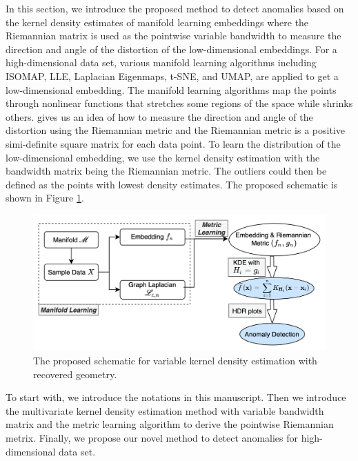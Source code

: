 \documentclass[11pt,a4paper,]{article}
\begin{document}
In this section, we introduce the proposed method to detect anomalies based on the kernel density estimates of manifold learning embeddings where the Riemannian matrix is used as the pointwise variable bandwidth to measure the direction and angle of the distortion of the low-dimensional embeddings. For a high-dimensional data set, various manifold learning algorithms including ISOMAP, LLE, Laplacian Eigenmaps, t-SNE, and UMAP, are applied to get a low-dimensional embedding. The manifold learning algorithms map the points through nonlinear functions that stretches some regions of the space while shrinks others. \textcite{Perrault-Joncas2013-pq} gives us an idea of how to measure the direction and angle of the distortion using the Riemannian metric and the Riemannian metric is a positive simi-definite square matrix for each data point. To learn the distribution of the low-dimensional embedding, we use the kernel density estimation with the bandwidth matrix being the Riemannian metric. The outliers could then be defined as the points with lowest density estimates. The proposed schematic is shown in Figure \ref{fig:vkde}.



\begin{figure}

{\centering \includegraphics[width=0.95\linewidth]{figures/vkde} 

}

\caption{The proposed schematic for variable kernel density estimation with recovered geometry.}\label{fig:vkde}
\end{figure}

To start with, we introduce the notations in this manuscript. Then we introduce the multivariate kernel density estimation method with variable bandwidth matrix and the metric learning algorithm to derive the pointwise Riemannian metrix. Finally, we propose our novel method to detect anomalies for high-dimensional data set.
\end{document}
